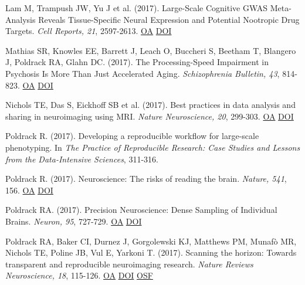 \documentclass[10pt, letterpaper]{article}
\begin{document}
Lam M, Trampush JW, Yu J et al. (2017). Large-Scale Cognitive GWAS Meta-Analysis Reveals Tissue-Specific Neural Expression and Potential Nootropic Drug Targets. \textit{Cell Reports, 21}, 2597-2613. \href{https://www.ncbi.nlm.nih.gov/pmc/articles/PMC5789458}{OA} \href{https://doi.org/10.1016/j.celrep.2017.11.028}{DOI} \vspace{2mm}

Mathias SR, Knowles EE, Barrett J, Leach O, Buccheri S, Beetham T, Blangero J, Poldrack RA, Glahn DC.  (2017). The Processing-Speed Impairment in Psychosis Is More Than Just Accelerated Aging. \textit{Schizophrenia Bulletin, 43}, 814-823. \href{https://www.ncbi.nlm.nih.gov/pmc/articles/PMC5472152}{OA} \href{https://doi.org/10.1093/schbul/sbw168}{DOI} \vspace{2mm}

Nichols TE, Das S, Eickhoff SB et al. (2017). Best practices in data analysis and sharing in neuroimaging using MRI. \textit{Nature Neuroscience, 20}, 299-303. \href{https://www.ncbi.nlm.nih.gov/pmc/articles/PMC5685169}{OA} \href{https://doi.org/10.1038/nn.4500}{DOI} \vspace{2mm}

Poldrack R.  (2017). Developing a reproducible workflow for large-scale phenotyping. In \textit{The Practice of Reproducible Research: Case Studies and Lessons from the Data-Intensive Sciences}, 311-316. \vspace{2mm}

Poldrack R.  (2017). Neuroscience: The risks of reading the brain. \textit{Nature, 541}, 156. \href{https://doi.org/10.1038/541156a}{OA} \href{https://doi.org/10.1038/541156a}{DOI} \vspace{2mm}

Poldrack RA.  (2017). Precision Neuroscience: Dense Sampling of Individual Brains. \textit{Neuron, 95}, 727-729. \href{https://doi.org/10.1016/j.neuron.2017.08.002}{OA} \href{https://doi.org/10.1016/j.neuron.2017.08.002}{DOI} \vspace{2mm}

Poldrack RA, Baker CI, Durnez J, Gorgolewski KJ, Matthews PM, Munafò MR, Nichols TE, Poline JB, Vul E, Yarkoni T.  (2017). Scanning the horizon: Towards transparent and reproducible neuroimaging research. \textit{Nature Reviews Neuroscience, 18}, 115-126. \href{https://www.ncbi.nlm.nih.gov/pmc/articles/PMC6910649}{OA} \href{https://doi.org/10.1038/nrn.2016.167}{DOI} \href{https://osf.io/spr9a/}{OSF} \vspace{2mm}
\end{document}
